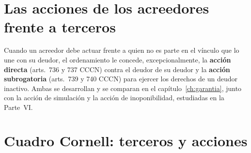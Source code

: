 \documentclass[12pt,oneside]{book}
\begin{document}
\section{Las acciones de los acreedores frente a terceros}

Cuando un acreedor debe actuar frente a quien no es parte en el vínculo que lo une con su deudor, el ordenamiento le concede, excepcionalmente, la \textbf{acción directa} (arts.~736 y 737 CCCN) contra el deudor de su deudor y la \textbf{acción subrogatoria} (arts.~739 y 740 CCCN) para ejercer los derechos de un deudor inactivo. Ambas se desarrollan y se comparan en el capítulo~\ref{ch:garantia}, junto con la acción de simulación y la acción de inoponibilidad, estudiadas en la Parte~VI.

\section{Cuadro Cornell: terceros y acciones}
\end{document}
